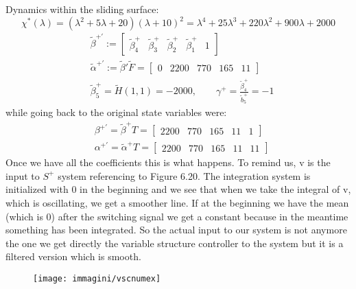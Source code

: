 Dynamics within the sliding surface:
\[\chi^*(\lambda)=(\lambda^2+5\lambda+20)(\lambda+10)^2=\lambda^4+25\lambda^3+220\lambda^2+900\lambda+2000\]
\[
\begin{aligned}
		&\tilde{\beta}^{+'}:=\begin{bmatrix}
			\tilde{\beta}^+_4 & \tilde{\beta}^+_3 & \tilde{\beta}^+_2 & \tilde{\beta}^+_1 & 1
		\end{bmatrix}\\
	&\tilde{\alpha}^{+'}:=\tilde{\beta}'\tilde{F}=\begin{bmatrix}
		0 & 2200  &770 & 165 & 11
	\end{bmatrix}\\
	&\tilde{\beta}^+_5=\tilde{H}(1,1)=-2000,\qquad \gamma^+=\frac{\tilde{\beta}^+_4}{\tilde{b}^+_5}=-1
\end{aligned}
\]while going back to the original state variables were:
\[
\begin{aligned}
	&\beta^{+'}=\tilde{\beta}^+T=\begin{bmatrix}
		2200 & 770 & 165 & 11 & 1
	\end{bmatrix}\\
&\alpha^{+'}=\tilde{\alpha}^+T=\begin{bmatrix}
	2200 & 770 & 165 & 11 & 11
\end{bmatrix}
\end{aligned}
\]Once we have all the coefficients this is what happens. To remind us, v is the input to $S^+$ system referencing to Figure 6.20. The integration system is initialized with 0 in the beginning and we see that when we take the integral of v, which is oscillating, we get a smoother line. If at the beginning we have the mean (which is 0) after the switching signal we get a constant because in the meantime something has been integrated. So the actual input to our system is not anymore the one we get directly the variable structure controller  to the system but it is a filtered version which is smooth.
\begin{figure}[H]
	\centering
	\texttt{[image: immagini/vscnumex]}
	\caption{}
	\label{fig:vscnumex}
\end{figure}
